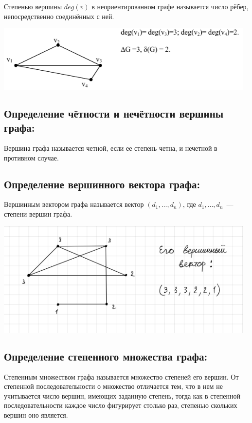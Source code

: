 \documentclass[14pt]{extarticle}
\begin{document}
Степенью вершины $deg(v)$ в неориентированном графе называется число рёбер,
непосредственно соединённых с ней.

\begin{center}
    \includegraphics[width=130mm]{"3.5.1.png"}
\end{center}

\subsection{Определение чётности и нечётности вершины графа:}

Вершина графа называется четной, если ее степень четна,
и нечетной в противном случае.

\subsection{Определение вершинного вектора графа:}

Вершинным вектором графа называется вектор $(d_1, \dots, d_n)$,
где $d_1, \dots, d_n$~--- степени вершин графа.

\begin{center}
    \includegraphics[width=130mm]{"3.7.1.png"}
\end{center}

\subsection{Определение степенного множества графа:}

Степенным множеством графа называется множество степеней его вершин.
От степенной последовательности о множество отличается тем, что в нем не
учитывается число вершин, имеющих заданную степень, тогда как в степенной
последовательности каждое число фигурирует столько раз, степенью скольких
вершин оно является.
\end{document}
